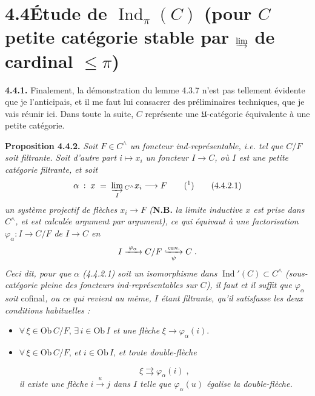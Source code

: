 \documentclass[11pt]{article}
\newcommand{\printedpage}[1]{\if\relax\detokenize{#1}\relax\else\marginpar{\footnotesize p.~#1}\fi}
\newcommand{\msp}[1]{\marginpar{\footnotesize [#1]}}
\newcommand{\Ob}{\mathrm{Ob}\,}
\newcommand{\Ind}{\operatorname{Ind}}
\newcommand{\hookxrightarrow}[2][]{\lhook\joinrel\xrightarrow[#1]{#2}}
\begin{document}
\msp{page 79}

\section*{4.4\quad Étude de $\Ind_\pi(C)$ (pour $C$ petite catégorie stable par $\varinjlim$ de cardinal $\leqslant \pi$)}

\textbf{4.4.1.} Finalement, la démonstration du lemme 4.3.7 n'est pas tellement évidente que je l'anticipais, et il me faut lui consacrer des préliminaires techniques, que je vais réunir ici. Dans toute la suite, $C$ représente une $\mathfrak{U}$-catégorie équivalente à une petite catégorie.

\printedpage{16}

\textbf{Proposition 4.4.2.} \textit{Soit $F \in C^{\wedge}$ un foncteur ind-représentable, i.e. tel que $C/F$ soit filtrante. Soit d'autre part $i \longmapsto x_i$ un foncteur $I \longrightarrow C$, où $I$ est une petite catégorie filtrante, et soit}
\[
\alpha \;:\; x \;=\; \varinjlim_{I}{}_{C^{\wedge}} x_i \longrightarrow F \qquad \text{(\footnotemark)} \tag*{(4.4.2.1)}
\]
\textit{un système projectif de flèches $x_i \longrightarrow F$ (}\textbf{N.B.} \textit{la limite inductive $x$ est prise dans $C^{\wedge}$, et est calculée argument par argument), ce qui équivaut à une factorisation $\varphi_\alpha : I \longrightarrow C/F$ de $I \longrightarrow C$ en}
\[
I \xrightarrow{\;\varphi_\alpha\;} C/F \hookxrightarrow[\psi]{\textit{can.}} C \;.
\]
\textit{Ceci dit, pour que $\alpha$ (4.4.2.1) soit un isomorphisme dans} $\Ind'(C) \subset C^{\wedge}$ \textit{(sous-catégorie pleine des foncteurs ind-représentables sur $C$), il faut et il suffit que $\varphi_\alpha$ soit} cofinal\textit{, ou ce qui revient au même, $I$ étant filtrante, qu'il satisfasse les deux conditions habituelles :}
\begin{itemize}[leftmargin=2.5em]
\item[F\,1)] $\forall\, \xi \in \Ob C/F$, $\exists\, i \in \Ob I$ \textit{et une flèche} $\xi \longrightarrow \varphi_\alpha(i)$.
\item[F\,2)] $\forall\, \xi \in \Ob C/F$, \textit{et} $i \in \Ob I$, \textit{et toute double-flèche}

\msp{page 80}
\[
\xi \rightrightarrows \varphi_\alpha(i) \;,
\]
\textit{il existe une flèche $i \xrightarrow{\;u\;} j$ dans $I$ telle que $\varphi_\alpha(u)$ égalise la double-flèche.}
\end{itemize}
\end{document}
